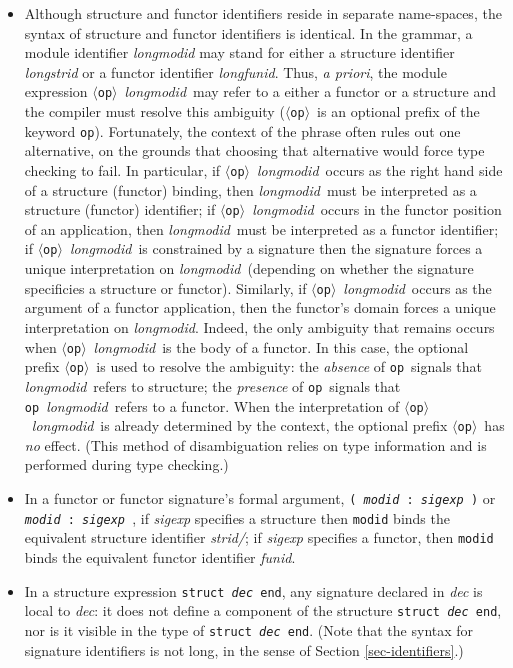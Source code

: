 \documentclass[fleqn]{article}
\newcommand{\la}{$\langle$}
\newcommand{\ra}{$\rangle$}
\newcommand{\opop}{\la{\tt op}\ra}
\newcommand{\op}{{\tt op}}
\newcommand{\longmodid}{{\it longmodid}}
\begin{document}
\begin{itemize}

 \item  Although structure and functor identifiers reside in separate name-spaces,
 the syntax of structure and functor identifiers is identical.
 In the grammar, a module identifier {\it longmodid} may stand for either a 
 structure identifier {\it longstrid} or a functor identifier {\it longfunid}.
 Thus, {\sl a priori}, the module expression \opop\ \longmodid\
 may refer to a either a functor or a structure and the compiler
 must resolve this ambiguity (\opop\ is an optional prefix of the keyword \op).
 Fortunately,
 the context of the phrase often rules out one
 alternative, on the grounds that choosing that alternative 
 would force type checking to fail. In particular,
 if \opop\ \longmodid\ occurs as the right hand side of a structure
 (functor) binding, then \longmodid\ must be interpreted as a
 structure (functor) identifier; if
 \opop\ \longmodid\ occurs in the functor position of an application, then
 \longmodid\ must be interpreted as a functor identifier; if
 \opop\ \longmodid\ is constrained by a signature
 then the signature 
 forces a unique interpretation 
 on \longmodid\ (depending on whether the signature specificies a structure or functor).
 Similarly, if \opop\ \longmodid\ occurs as the argument of a functor application,
 then the functor's domain forces a unique interpretation 
 on \longmodid.
 Indeed, the only ambiguity that remains occurs when \opop\ \longmodid\ is the body of a functor. In this case, the optional prefix \opop\ is used to resolve
 the ambiguity:  the {\sl absence} of \op\ signals
 that \longmodid\ refers to structure; the {\sl presence} of \op\ signals that
 \op~\longmodid\ refers to a functor. 
 When the interpretation of \opop\ \longmodid\ is already
 determined by the context, the optional prefix \opop\ has {\sl no} effect.
 (This method of disambiguation relies on type information and is performed during
 type checking.)

 \item In a functor or functor signature's formal argument, 
{\tt ( {\it modid\/} :\ {\it sigexp} )} or 
{\tt {\it modid\/} :\ {\it sigexp} }, 
if {\it sigexp}
specifies a structure then {\tt modid} binds the equivalent
structure identifier {\it strid/};
if  {\it sigexp} specifies a functor, then {\tt modid}
binds the equivalent functor identifier {\it funid}.



\item In a structure expression {\tt struct {\it dec\/} end}, any
signature declared in {\it dec\/} is local to {\it dec\/}: it does not
define a component of the structure {\tt struct {\it dec\/} end}, nor
is it visible in the type of {\tt struct {\it dec\/} end}.
(Note that the syntax for signature identifiers is not long, in
the sense of Section \ref{sec-identifiers}.)


\end{itemize}
\end{document}
